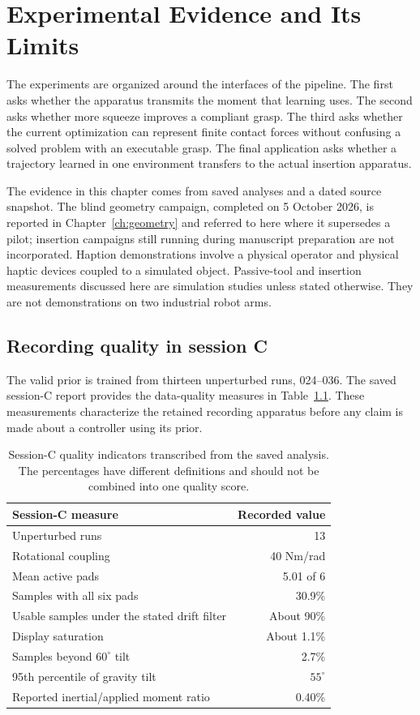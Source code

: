 \chapter{Experimental Evidence and Its Limits}
\label{ch:evidence}

The experiments are organized around the interfaces of the pipeline. The first asks whether the apparatus transmits the moment that learning uses. The second asks whether more squeeze improves a compliant grasp. The third asks whether the current optimization can represent finite contact forces without confusing a solved problem with an executable grasp. The final application asks whether a trajectory learned in one environment transfers to the actual insertion apparatus.

The evidence in this chapter comes from saved analyses and a dated source snapshot. The blind geometry campaign, completed on 5 October 2026, is reported in Chapter~\ref{ch:geometry} and referred to here where it supersedes a pilot; insertion campaigns still running during manuscript preparation are not incorporated. Haption demonstrations involve a physical operator and physical haptic devices coupled to a simulated object. Passive-tool and insertion measurements discussed here are simulation studies unless stated otherwise. They are not demonstrations on two industrial robot arms.

\section{Recording quality in session C}

The valid prior is trained from thirteen unperturbed runs, 024--036. The saved session-C report provides the data-quality measures in Table~\ref{tab:session-c}. These measurements characterize the retained recording apparatus before any claim is made about a controller using its prior.

\begin{table}[htbp]\centering\small
\begin{tabular}{@{}lr@{}}\toprule
Session-C measure & Recorded value \\\midrule
Unperturbed runs & 13\\
Rotational coupling & 40 Nm/rad\\
Mean active pads & 5.01 of 6\\
Samples with all six pads & 30.9\%\\
Usable samples under the stated drift filter & About 90\%\\
Display saturation & About 1.1\%\\
Samples beyond $60^\circ$ tilt & 2.7\%\\
95th percentile of gravity tilt & $55^\circ$\\
Reported inertial/applied moment ratio & 0.40\%\\
\bottomrule\end{tabular}
\caption{Session-C quality indicators transcribed from the saved analysis. The percentages have different definitions and should not be combined into one quality score.}
\label{tab:session-c}
\end{table}

